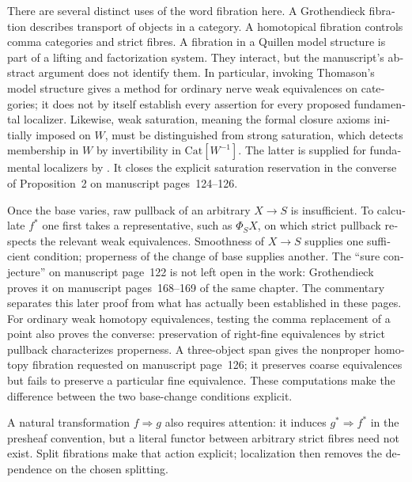\begin{otherlanguage}{english}
There are several distinct uses of the word fibration here. A Grothendieck fibration describes transport of objects in a category. A homotopical fibration controls comma categories and strict fibres. A fibration in a Quillen model structure is part of a lifting and factorization system. They interact, but the manuscript's abstract argument does not identify them. In particular, invoking Thomason's model structure gives a method for ordinary nerve weak equivalences on categories; it does not by itself establish every assertion for every proposed fundamental localizer. Likewise, weak saturation, meaning the formal closure axioms initially imposed on $W$, must be distinguished from strong saturation, which detects membership in $W$ by invertibility in $\mathrm{Cat}[W^{-1}]$. The latter is supplied for fundamental localizers by \citet[Proposition~4.2.4 in the cited author version]{Cisinski2006Presheaves}. It closes the explicit saturation reservation in the converse of Proposition~2 on manuscript pages~124--126.

Once the base varies, raw pullback of an arbitrary $X\to S$ is insufficient. To calculate $f^*$ one first takes a representative, such as $\Phi_SX$, on which strict pullback respects the relevant weak equivalences. Smoothness of $X\to S$ supplies one sufficient condition; properness of the change of base supplies another. The ``sure conjecture'' on manuscript page~122 is not left open in the work: Grothendieck proves it on manuscript pages~168--169 of the same chapter. The commentary separates this later proof from what has actually been established in these pages. For ordinary weak homotopy equivalences, testing the comma replacement of a point also proves the converse: preservation of right-fine equivalences by strict pullback characterizes properness. A three-object span gives the nonproper homotopy fibration requested on manuscript page~126; it preserves coarse equivalences but fails to preserve a particular fine equivalence. These computations make the difference between the two base-change conditions explicit.

A natural transformation $f\Rightarrow g$ also requires attention: it induces $g^*\Rightarrow f^*$ in the presheaf convention, but a literal functor between arbitrary strict fibres need not exist. Split fibrations make that action explicit; localization then removes the dependence on the chosen splitting.


\end{otherlanguage}
